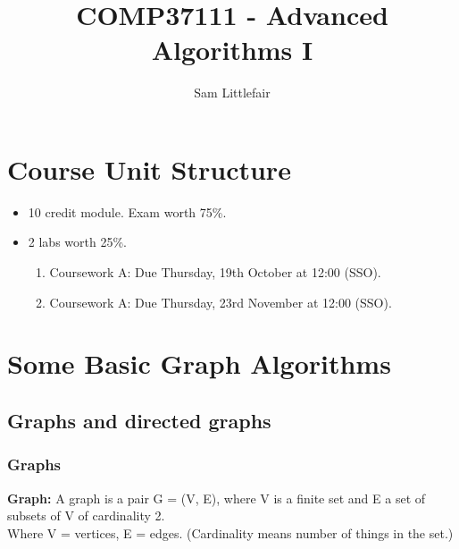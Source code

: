 \documentclass[11pt]{article}
\title{COMP37111 - Advanced Algorithms I}
\author{Sam Littlefair}
\begin{document}
\maketitle

\section{Course Unit Structure}
\begin{itemize}
  \item 10 credit module. Exam worth 75\%.
  \item 2 labs worth 25\%.
  \begin{enumerate}
    \item Coursework A: Due Thursday, 19th October at 12:00 (SSO).
    \item Coursework A: Due Thursday, 23rd November at 12:00 (SSO).
  \end{enumerate}
\end{itemize}

\section{Some Basic Graph Algorithms}
\subsection{Graphs and directed graphs}
\subsubsection{Graphs}
\textbf{Graph:} A graph is a pair G = (V, E), where V is a finite set and E a
set of subsets of V of cardinality 2. \\ \hspace*{14mm} Where V = vertices, E = edges. (Cardinality means number of things in the set.)
\end{document}
